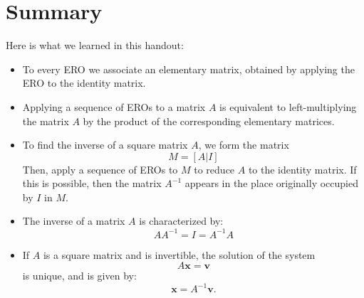 \documentclass[12pt]{article}
\begin{document}
\section{Summary}

Here is what we learned in this handout:

\begin{itemize}
\item To every ERO we associate an elementary matrix, obtained by applying the ERO to the identity matrix.
\item Applying a sequence of EROs to a matrix $A$ is equivalent to left-multiplying the matrix $A$ by the product of the corresponding elementary matrices.
\item To find the inverse of a square matrix $A$, we form the matrix
\[
M=\left[A|I\right]
\]
Then, apply a sequence of EROs to $M$ to reduce $A$ to the identity matrix. If this is possible, then the matrix $A^{-1}$ appears in the place originally occupied by $I$ in $M$.
\item The inverse of a matrix $A$ is characterized by:
\[
AA^{-1}=I=A^{-1}A
\]
\item If $A$ is a square matrix and is invertible, the solution of the system
\[
A\mathbf{x}=\mathbf{v}
\] 
is unique, and is given by:
\[
\mathbf{x}=A^{-1}\mathbf{v}.
\]
\end{itemize}
\end{document}
